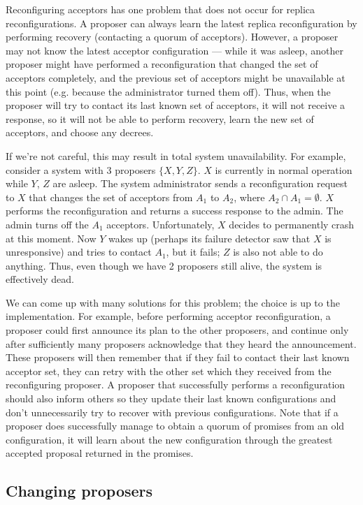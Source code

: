 \documentclass[12pt,a4paper,en]{pracamgr}
\begin{document}
Reconfiguring acceptors has one problem that does not occur for replica reconfigurations. A proposer can always learn the latest replica reconfiguration by performing recovery (contacting a quorum of acceptors). However, a proposer may not know the latest acceptor configuration --- while it was asleep, another proposer might have performed a reconfiguration that changed the set of acceptors completely, and the previous set of acceptors might be unavailable at this point (e.g. because the administrator turned them off). Thus, when the proposer will try to contact its last known set of acceptors, it will not receive a response, so it will not be able to perform recovery, learn the new set of acceptors, and choose any decrees.

If we're not careful, this may result in total system unavailability. For example, consider a system with 3 proposers $\{X, Y, Z\}$. $X$ is currently in normal operation while $Y$, $Z$ are asleep. The system administrator sends a reconfiguration request to $X$ that changes the set of acceptors from $A_1$ to $A_2$, where $A_2 \cap A_1 = \emptyset$. $X$ performs the reconfiguration and returns a success response to the admin. The admin turns off the $A_1$ acceptors. Unfortunately, $X$ decides to permanently crash at this moment. Now $Y$ wakes up (perhaps its failure detector saw that $X$ is unresponsive) and tries to contact $A_1$, but it fails; $Z$ is also not able to do anything. Thus, even though we have 2 proposers still alive, the system is effectively dead.

We can come up with many solutions for this problem; the choice is up to the implementation. For example, before performing acceptor reconfiguration, a proposer could first announce its plan to the other proposers, and continue only after sufficiently many proposers acknowledge that they heard the announcement. These proposers will then remember that if they fail to contact their last known acceptor set, they can retry with the other set which they received from the reconfiguring proposer. A proposer that successfully performs a reconfiguration should also inform others so they update their last known configurations and don't unnecessarily try to recover with previous configurations. Note that if a proposer does successfully manage to obtain a quorum of promises from an old configuration, it will learn about the new configuration through the greatest accepted proposal returned in the promises.

\subsection{Changing proposers}
\end{document}
